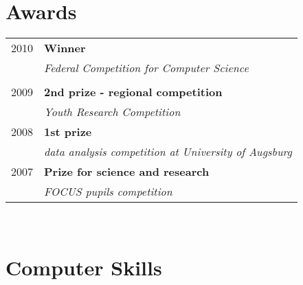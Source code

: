 \documentclass[a4paper,10pt]{article} %
\begin{document}
{\begin{minipage}[t]{0.44\textwidth}

\section{Awards}

\begin{tabular}{rl}
2010	 & \textbf{Winner}\\
& \textit{Federal Competition for Computer Science}\\ \\


2009	 & \textbf{2nd prize - regional competition}\\
& \textit{Youth Research Competition}\\[10pt]


2008	 & \textbf{1st prize}\\
& \textit{data analysis competition at University of Augsburg}\\[10pt]




2007	 & \textbf{Prize for science and research}\\
& \textit{FOCUS pupils competition}
\end{tabular}\\[10pt]


\section{Computer Skills}


\end{minipage}}
\end{document}
